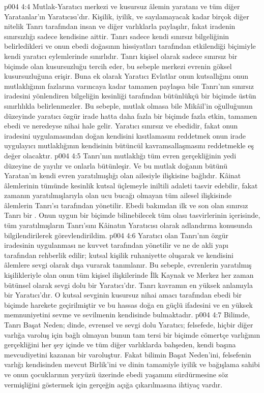 \vs p004 4:4 Mutlak\hyp{}Yaratıcı merkezi ve kusursuz âlemin yaratanı ve tüm diğer Yaratanlar’ın Yaratıcısı’dır. Kişilik, iyilik, ve sayılamayacak kadar birçok diğer nitelik Tanrı tarafından insan ve diğer varlıklarla paylaşılır, fakat iradenin sınırsızlığı sadece kendisine aittir. Tanrı sadece kendi sınırsız bilgeliğinin belirledikleri ve onun ebedi doğasının hissiyatları tarafından etkilendiği biçimiyle kendi yaratıcı eylemlerinde sınırlıdır. Tanrı kişisel olarak sadece sınırsız bir biçimde olan kusursuzluğu tercih eder, bu sebeple merkezi evrenin göksel kusursuzluğuna erişir. Buna ek olarak Yaratıcı Evlatlar onun kutsallığını onun mutlaklığının fazlarına varıncaya kadar tamamen paylaşsa bile Tanrı’nın sınırsız iradesini yönlendiren bilgeliğin kesinliği tarafından bütünlükçü bir biçimde üstün sınırlılıkla belirlenmezler. Bu sebeple, mutlak olmasa bile Mikâil’in oğulluğunun düzeyinde yaratıcı özgür irade hatta daha fazla bir biçimde fazla etkin, tamamen ebedi ve neredeyse nihai hale gelir. Yaratıcı sınırsız ve ebedidir, fakat onun iradesini uygulamasından doğan kendisini kısıtlamasını reddetmek onun irade uygulayıcı mutlaklığının kendisinin bütüncül kavramsallaşmasını reddetmekle eş değer olacaktır.
\vs p004 4:5 Tanrı’nın mutlaklığı tüm evren gerçekliğinin yedi düzeyine de yayılır ve onlarla bütünleşir. Ve bu mutlak doğanın bütünü Yaratan’ın kendi evren yaratılmışlığı olan ailesiyle ilişkisine bağlıdır. Kâinat âlemlerinin tümünde kesinlik kutsal üçlemeyle iniltili adaleti tasvir edebilir, fakat zamanın yaratılmışlarıyla olan ucu bucağı olmayan tüm ailesel ilişkisinde âlemlerin Tanrı’sı  tarafından yönetilir. Ebedi bakımdan ilk ve son olan sınırsız Tanrı bir . Onun uygun bir biçimde bilinebilecek tüm olası tasvirlerinin içerisinde, tüm yaratılmışların Tanrı’sını Kâinatın Yaratıcısı olarak adlandırma konusunda bilgilendirilerek görevlendirildim.
\vs p004 4:6 Yaratıcı olan Tanrı’nın özgür iradesinin uygulanması ne kuvvet tarafından yönetilir ve ne de akli yapı tarafından rehberlik edilir; kutsal kişilik ruhaniyette oluşarak ve kendisini âlemlere sevgi olarak dışa vurarak tanımlanır. Bu sebeple, evrenlerin yaratılmış kişilikleriyle olan onun tüm kişisel ilişkilerinde İlk Kaynak ve Merkez her zaman bütünsel olarak sevgi dolu bir Yaratıcı’dır. Tanrı kavramın en yüksek anlamıyla bir Yaratıcı’dır. O kutsal sevginin kusursuz nihai amacı tarafından ebedi bir biçimde harekete geçirilmiştir ve bu hassas doğa en güçlü ifadesini ve en yüksek memnuniyetini sevme ve sevilmenin kendisinde bulmaktadır.
\vs p004 4:7 Bilimde, Tanrı Başat Neden; dinde, evrensel ve sevgi dolu Yaratıcı; felsefede, hiçbir diğer varlığa varoluş için bağlı olmayan bunun tam tersi bir biçimde cömertçe varlığının gerçekliğini her şey içinde ve tüm diğer varlıklarda bahşeden, kendi başına mevcudiyetini kazanan bir varoluştur. Fakat bilimin Başat Neden’ini, felsefenin varlığı kendisinden mevcut Birlik’ini ve dinin tamamiyle iyilik ve bağışlama sahibi ve onun çocuklarının yeryüzü üzerinde ebedi yaşamını sürdürmesine söz vermişliğini göstermek için gerçeğin açığa çıkarılmasına ihtiyaç vardır.
